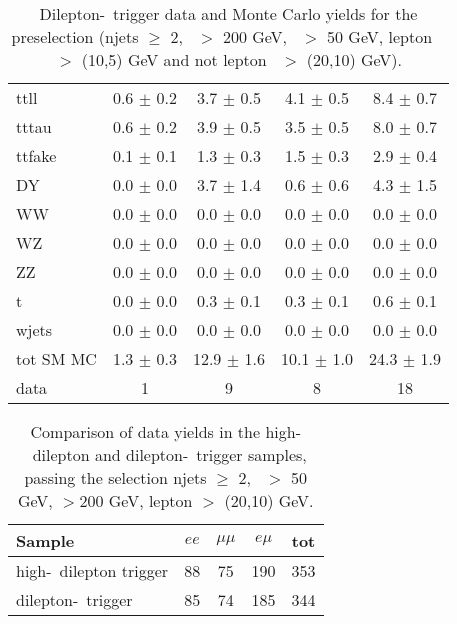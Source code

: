 \begin{table}[htb]
\begin{center}
\caption{\label{tab:yields3} 
Dilepton-\Ht\ trigger data and Monte Carlo yields for the preselection 
(njets $\geq$ 2, \Ht\ $>$ 200 GeV, \met\ $>$ 50 GeV, lepton \pt\ $>$ (10,5) GeV and not 
lepton \pt\ $>$ (20,10) GeV).
}
\begin{tabular}{l|cccc}

\hline
           ttll   &  0.6 $\pm$ 0.2   &  3.7 $\pm$ 0.5   &  4.1 $\pm$ 0.5   &  8.4 $\pm$ 0.7  \\
          tttau   &  0.6 $\pm$ 0.2   &  3.9 $\pm$ 0.5   &  3.5 $\pm$ 0.5   &  8.0 $\pm$ 0.7  \\
         ttfake   &  0.1 $\pm$ 0.1   &  1.3 $\pm$ 0.3   &  1.5 $\pm$ 0.3   &  2.9 $\pm$ 0.4  \\
             DY   &  0.0 $\pm$ 0.0   &  3.7 $\pm$ 1.4   &  0.6 $\pm$ 0.6   &  4.3 $\pm$ 1.5  \\
             WW   &  0.0 $\pm$ 0.0   &  0.0 $\pm$ 0.0   &  0.0 $\pm$ 0.0   &  0.0 $\pm$ 0.0  \\
             WZ   &  0.0 $\pm$ 0.0   &  0.0 $\pm$ 0.0   &  0.0 $\pm$ 0.0   &  0.0 $\pm$ 0.0  \\
             ZZ   &  0.0 $\pm$ 0.0   &  0.0 $\pm$ 0.0   &  0.0 $\pm$ 0.0   &  0.0 $\pm$ 0.0  \\
              t   &  0.0 $\pm$ 0.0   &  0.3 $\pm$ 0.1   &  0.3 $\pm$ 0.1   &  0.6 $\pm$ 0.1  \\
          wjets   &  0.0 $\pm$ 0.0   &  0.0 $\pm$ 0.0   &  0.0 $\pm$ 0.0   &  0.0 $\pm$ 0.0  \\
\hline
      tot SM MC   &  1.3 $\pm$ 0.3   & 12.9 $\pm$ 1.6   & 10.1 $\pm$ 1.0   & 24.3 $\pm$ 1.9  \\
\hline
           data   &              1   &              9   &              8   &             18  \\
\hline
\end{tabular}
\end{center}
\end{table}

\begin{table}[htb]
\begin{center}
\caption{\label{tab:yields4} Comparison of data yields in the high-\pt\ dilepton and dilepton-\Ht\ 
trigger samples, passing the selection njets $\geq$ 2, \met\ $>$ 50 GeV, \Ht$>$200 GeV,  lepton \pt $>$ (20,10) GeV.}
\begin{tabular}{l|cccc}
\hline
                    Sample   &           $ee$   &       $\mu\mu$   &         $e\mu$   &            tot  \\
\hline
high-\pt\ dilepton trigger   &             88   &             75   &            190   &            353  \\

dilepton-\Ht\ trigger        &             85   &             74   &            185   &            344  \\
\hline
\end{tabular}
\end{center}
\end{table}
